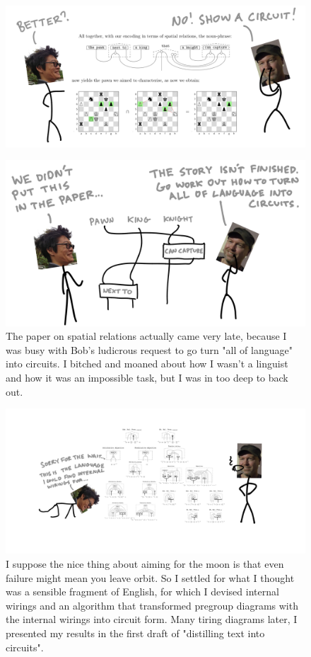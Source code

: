 \begin{figure}[h!]
\includegraphics{figures/cartoons/space2}
\end{figure}

\begin{figure}[h!]
\includegraphics{figures/cartoons/space3}
\caption{The paper on spatial relations actually came very late, because I was busy with Bob's ludicrous request to go turn "all of language" into circuits. I bitched and moaned about how I wasn't a linguist and how it was an impossible task, but I was in too deep to back out.}
\end{figure}

\begin{figure}[h!]
\includegraphics{figures/cartoons/pregroup1}
\caption{I suppose the nice thing about aiming for the moon is that even failure might mean you leave orbit. So I settled for what I thought was a sensible fragment of English, for which I devised internal wirings and an algorithm that transformed pregroup diagrams with the internal wirings into circuit form. Many tiring diagrams later, I presented my results in the first draft of "distilling text into circuits".}
\end{figure}

